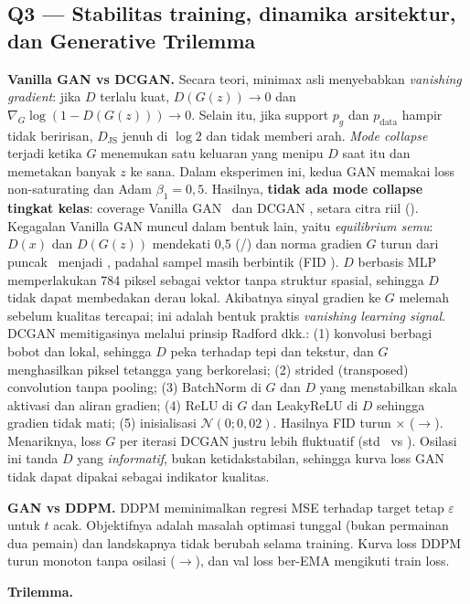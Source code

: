 \subsection*{Q3 --- Stabilitas training, dinamika arsitektur, dan Generative Trilemma}
\textbf{Vanilla GAN vs DCGAN.} Secara teori, minimax asli menyebabkan \emph{vanishing gradient}: jika $D$ terlalu kuat,
$D(G(z))\to0$ dan $\nabla_G\log(1-D(G(z)))\to0$. Selain itu, jika support $p_g$ dan $p_{\text{data}}$ hampir tidak beririsan,
$D_{\text{JS}}$ jenuh di $\log2$ dan tidak memberi arah. \emph{Mode collapse} terjadi ketika $G$ menemukan satu keluaran
yang menipu $D$ saat itu dan memetakan banyak $z$ ke sana. Dalam eksperimen ini, kedua GAN memakai loss non-saturating dan
Adam $\beta_1=0{,}5$. Hasilnya, \textbf{tidak ada mode collapse tingkat kelas}: coverage Vanilla GAN \COVGAN\ dan DCGAN \COVDCGAN,
setara citra riil (\COVreal). Kegagalan Vanilla GAN muncul dalam bentuk lain, yaitu \emph{equilibrium semu}: $D(x)$ dan
$D(G(z))$ mendekati 0,5 (\DRGAN/\DFGAN) dan norma gradien $G$ turun dari puncak \GNGANfirst\ menjadi \GNGANlast, padahal sampel
masih berbintik (FID \FIDGAN). $D$ berbasis MLP memperlakukan 784 piksel sebagai vektor tanpa struktur spasial, sehingga
$D$ tidak dapat membedakan derau lokal. Akibatnya sinyal gradien ke $G$ melemah sebelum kualitas tercapai; ini adalah bentuk
praktis \emph{vanishing learning signal}. DCGAN memitigasinya melalui prinsip Radford dkk.:
(1) konvolusi berbagi bobot dan lokal, sehingga $D$ peka terhadap tepi dan tekstur, dan $G$ menghasilkan piksel tetangga yang
berkorelasi; (2) strided (transposed) convolution tanpa pooling; (3) BatchNorm di $G$ dan $D$ yang menstabilkan skala aktivasi
dan aliran gradien; (4) ReLU di $G$ dan LeakyReLU di $D$ sehingga gradien tidak mati; (5) inisialisasi $\mathcal{N}(0;0{,}02)$.
Hasilnya FID turun \GANoverDCGAN$\times$ (\FIDGAN$\to$\FIDDCGAN). Menariknya, loss $G$ per iterasi DCGAN justru lebih fluktuatif
(std \GSTDDCGAN\ vs \GSTDGAN). Osilasi ini tanda $D$ yang \emph{informatif}, bukan ketidakstabilan, sehingga kurva loss GAN tidak
dapat dipakai sebagai indikator kualitas.

\textbf{GAN vs DDPM.} DDPM meminimalkan regresi MSE terhadap target tetap $\varepsilon$ untuk $t$ acak. Objektifnya adalah
masalah optimasi tunggal (bukan permainan dua pemain) dan landskapnya tidak berubah selama training. Kurva loss DDPM turun
monoton tanpa osilasi (\DDPMfirst$\to$\DDPMlast), dan val loss ber-EMA mengikuti train loss.

\textbf{Trilemma.} \TrilemmaText

